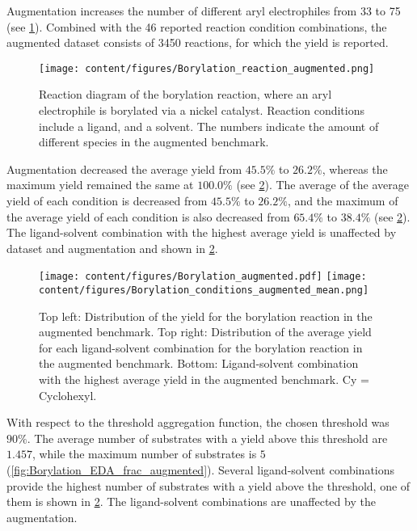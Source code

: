 Augmentation increases the number of different aryl electrophiles from 33 to 75 (see \cref{fig:Borylation_reaction_augmented}). Combined with the 46 reported reaction condition combinations, the augmented dataset consists of 3450 reactions, for which the yield is reported.

\begin{figure}[h]
    \centering
    \texttt{[image: content/figures/Borylation\_reaction\_augmented.png]}
    \caption{Reaction diagram of the borylation reaction, where an aryl electrophile is borylated via a nickel catalyst. Reaction conditions include a ligand, and a solvent. The numbers indicate the amount of different species in the augmented benchmark.}
    \label{fig:Borylation_reaction_augmented}
\end{figure}

Augmentation decreased the average yield from $45.5\%$ to $26.2\%$, whereas the maximum yield remained the same at $100.0\%$ (see \cref{fig:Borylation_EDA_augmented}).
The average of the average yield of each condition is decreased from $45.5\%$ to $26.2\%$, and the maximum of the average yield of each condition is also decreased from $65.4\%$ to $38.4\%$ (see \cref{fig:Borylation_EDA_augmented}).
The ligand-solvent combination with the highest average yield is unaffected by dataset and augmentation and shown in \cref{fig:Borylation_EDA_augmented}.

\begin{figure}[h]
    \centering
    \texttt{[image: content/figures/Borylation\_augmented.pdf]}
    \texttt{[image: content/figures/Borylation\_conditions\_augmented\_mean.png]}
    \caption{Top left: Distribution of the yield for the borylation reaction in the augmented benchmark. Top right: Distribution of the average yield for each ligand-solvent combination for the borylation reaction in the augmented benchmark. Bottom: Ligand-solvent combination with the highest average yield in the augmented benchmark. Cy = Cyclohexyl.}
    \label{fig:Borylation_EDA_augmented}
\end{figure}

With respect to the threshold aggregation function, the chosen threshold was $90\%$.
The average number of substrates with a yield above this threshold are $1.457$, while the maximum number of substrates is $5$ (\cref{fig:Borylation_EDA_frac_augmented}).
Several ligand-solvent combinations provide the highest number of substrates with a yield above the threshold, one of them is shown in \cref{fig:Borylation_EDA_augmented}.
The ligand-solvent combinations are unaffected by the augmentation.

